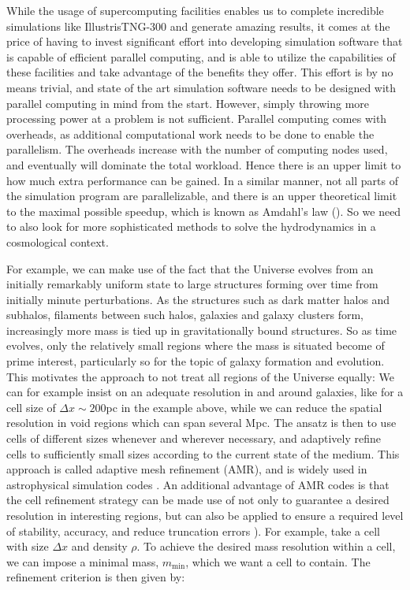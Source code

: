 While the usage of supercomputing facilities enables us to complete incredible simulations like
IllustrisTNG-300 and generate amazing results, it comes at the price of having to invest significant
effort into developing simulation software that is capable of efficient parallel computing, and is
able to utilize the capabilities of these facilities and take advantage of the benefits they offer.
This effort is by no means trivial, and state of the art simulation software needs to be designed
with parallel computing in mind from the start.
However, simply throwing more processing power at a problem is not sufficient. Parallel computing
comes with overheads, as additional computational work needs to be done to enable the parallelism.
The overheads increase with the number of computing nodes used, and eventually will dominate the
total workload. Hence there is an upper limit to how much extra performance can be gained. In a
similar manner, not all parts of the simulation program are parallelizable, and there is an upper
theoretical limit to the maximal possible speedup, which is known as Amdahl's law
(\cite{amdahlValiditySingleProcessor1967}). So we need to also look for more sophisticated methods
to solve the hydrodynamics in a cosmological context.

For example, we can make use of the fact that the Universe evolves from an initially remarkably
uniform state to large structures forming over time from initially minute perturbations. As the
structures such as dark matter halos and subhalos, filaments between such halos, galaxies and galaxy
clusters form, increasingly more mass is tied up in gravitationally bound structures. So as time
evolves, only the relatively small regions where the mass is situated become of prime interest,
particularly so for the topic of galaxy formation and evolution. This motivates the approach to not
treat all regions of the Universe equally: We can for example insist on an adequate resolution in
and around galaxies, like for a cell size of $\Delta x \sim 200$pc in the example above, while we
can reduce the spatial resolution in void regions which can span several Mpc. The ansatz is then to
use cells of different sizes whenever and wherever necessary, and adaptively refine cells to
sufficiently small sizes according to the current state of the medium. This approach is called
adaptive mesh refinement (AMR), and is widely used in astrophysical simulation codes
\citep[e.g.][]{teyssierCosmologicalHydrodynamicsAdaptive2002, stoneAthenaAdaptiveMesh2020,
hayesSimulatingRadiatingMagnetized2006, kravtsovAdaptiveRefinementTree1997,
mignonePLUTOCodeAdaptive2012, bryanENZOAdaptiveMesh2014}. An additional advantage of
AMR codes is that the cell refinement strategy can be made use of not only to guarantee a desired
resolution in interesting regions, but can also be applied to ensure a required level of stability,
accuracy, and reduce truncation errors \citep[see
e.g.][]{teyssierGridBasedHydrodynamicsAstrophysical2015a}). For example, take a cell with size
$\Delta x$ and density $\rho$. To achieve the desired mass resolution within a cell, we can impose
a minimal mass, $m_{\min}$, which we want a cell to contain. The refinement criterion is then given
by:

